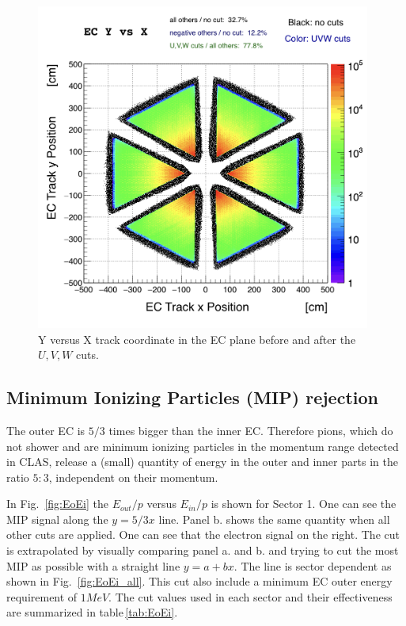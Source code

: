 \begin{figure}[ht]
  \centering
		\includegraphics[width=0.98\textwidth]{img/cut-09uvw_sector-all.png}
		\caption{Y versus X track coordinate in the EC plane before and after 
					the $U,V,W$ cuts.}
 		\label{fig:ECyx}
\end{figure}


\clearpage
\subsection{Minimum Ionizing Particles (MIP) rejection}
The outer EC is $5/3$ times bigger than the inner EC. Therefore pions,
which do not shower and are minimum ionizing particles in the momentum range 
detected in CLAS, release a (small) quantity of energy in the outer and inner
parts in the ratio $5:3$, independent on their momentum.

In Fig.~\ref{fig:EoEi} the $E_{out}/p$ versus $E_{in}/p$ is shown for Sector 1.
One can see the MIP signal along the $y=5/3x $ line.
Panel b. shows the same quantity when all other cuts are applied. 
One can see that the electron signal on the right.
The cut is extrapolated by visually comparing panel a. and b. and trying to
cut the most MIP as possible with a straight line $y = a + bx$. The line
is sector dependent as shown in Fig.~\ref{fig:EoEi_all}.
This cut also include a minimum EC outer energy requirement of $1MeV$.
The cut values used in each sector and their effectiveness are summarized in 
table\,\ref{tab:EoEi}.


